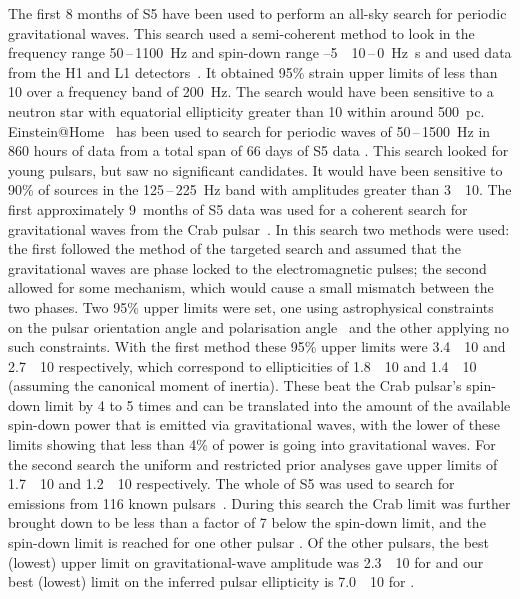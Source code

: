 \documentclass{article}
\begin{document}
The first 8 months of S5 have been used to perform an all-sky search for
periodic gravitational waves. This search used a semi-coherent method to look
in the frequency range 50\,--\,1100~Hz and spin-down range
--5~\texttimes~10\,--\,0~Hz~s and used data from
the H1 and L1 detectors~\cite{Abbott:2008i}. It obtained 95\% strain
upper limits of less than 10 over a frequency band of
200~Hz. The search would have been sensitive to a neutron star with
equatorial ellipticity greater than 10 within around
500~pc. Einstein@Home~\cite{eath} has been used to search for periodic
waves of 50\,--\,1500~Hz in 860 hours of data from a total span
of 66 days of S5 data \cite{Abbott:2009a}. This search looked for
young pulsars, but saw no significant candidates. It would have been
sensitive to 90\% of sources in the 125\,--\,225~Hz band with
amplitudes greater than 3~\texttimes~10. The first
approximately 9~months of S5 data was used for a coherent search for
gravitational waves from the Crab pulsar~\cite{Abbott:2008j}. In this
search two methods were used: the first followed the method of the targeted
search and assumed that the gravitational waves are phase locked to
the electromagnetic pulses; the second allowed for some mechanism,
which would cause a small mismatch between the two phases. Two 95\%
upper limits were set, one using astrophysical
constraints on the pulsar orientation angle and polarisation angle~\cite{Ng:2008}
and the other applying no such constraints. With the first method these 95\%
upper limits were 3.4~\texttimes~10 and 2.7~\texttimes~10 respectively,
which correspond to ellipticities of 1.8~\texttimes~10 and 1.4~\texttimes~10
(assuming the canonical moment of inertia). These beat the Crab pulsar's
spin-down limit by 4 to 5 times and can be translated into the amount of the
available spin-down power that is emitted via gravitational waves, with the
lower of these limits showing that less than 4\% of power is going into
gravitational waves. For the second search the uniform and restricted prior analyses gave
upper limits of 1.7~\texttimes~10 and 1.2~\texttimes~10
respectively. The whole of S5 was used to search for emissions from 116 known
pulsars~\cite{Abbott:2010a}. During this search the Crab limit was further
brought down to be less than a factor of 7 below the spin-down limit, and the
spin-down limit is reached for one other pulsar . Of the other
pulsars, the best (lowest) upper limit on gravitational-wave amplitude was
2.3~\texttimes~10 for  and our best (lowest) limit on the
inferred pulsar ellipticity is 7.0~\texttimes~10 for .
\end{document}
